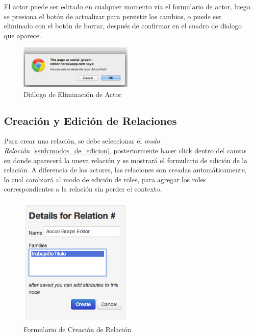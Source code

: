 El actor puede ser editado en cualquier momento vía el formulario de actor, luego se presiona el botón de actualizar para persistir los cambios, o puede ser eliminado con el botón de borrar, después de confirmar en el cuadro de dialogo que aparece.

\begin{figure}[H]
  \centering
  \includegraphics[width=0.5\textwidth]{images/dialogo_eliminacion_actor.png}
  \caption{Diálogo de Eliminación de Actor}
  \label{dialogo_eliminacion_actor}
\end{figure}


\subsection{Creación y Edición de Relaciones} %
\label{sub:creacion_y_edicion_de_relaciones}

Para crear una relación, se debe seleccionar el \emph{modo Relación}~\ref{ssub:modos_de_edicion}, posteriormente hacer click dentro del canvas en donde aparecerá la nueva relación y se mostrará el formulario de edición de la relación. A diferencia de los actores, las relaciones son creadas automáticamente, lo cual cambiará al modo de edición de roles, para agregar los roles correspondientes a la relación sin perder el contexto.

\begin{figure}[H]
  \centering
  \includegraphics[width=0.5\textwidth]{images/creacion_relacion.png}
  \caption{Formulario de Creación de Relación}
  \label{creacion_relacion}
\end{figure}

